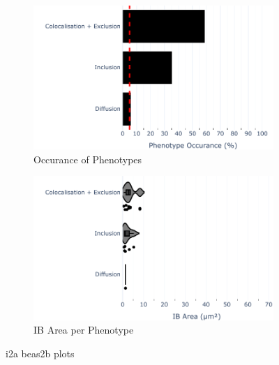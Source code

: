 \begin{figure}
    \begin{subfigure}{0.5\textwidth}
    \includegraphics[width=1\linewidth]{10. Chapter 5/Figs/01. Infection/01. IFIT2A/10. bar_i2a_beas2b.pdf} 
    \caption[]{Occurance of Phenotypes}
    \end{subfigure}
    \begin{subfigure}{0.5\textwidth}
    \includegraphics[width=1\linewidth]{10. Chapter 5/Figs/01. Infection/01. IFIT2A/11. violin_i2a_beas2b.pdf}
    \caption[]{IB Area per Phenotype}
    \end{subfigure}
    \caption[i2a beas2b plots]{i2a beas2b plots}
    \label{fig:i2a beas2b plots}
\end{figure}

